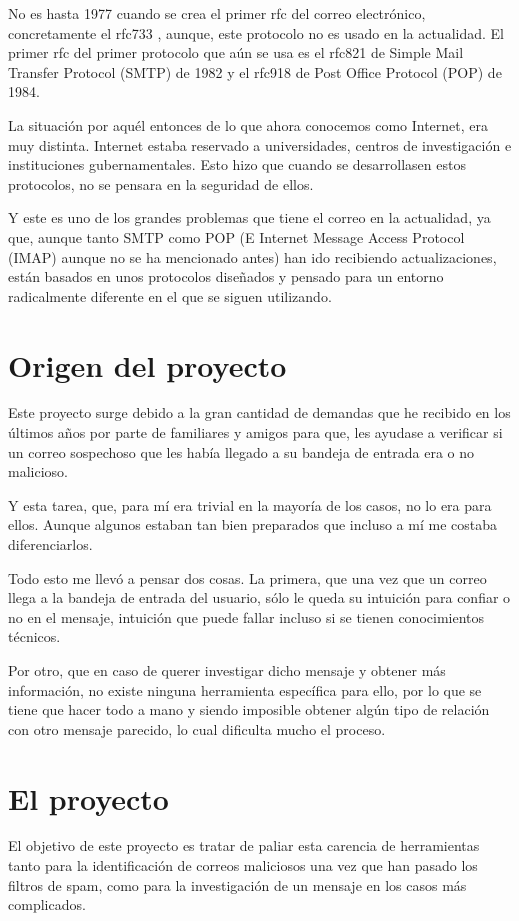No es hasta 1977 cuando se crea el primer rfc del correo electrónico, concretamente el rfc733 \cite{rfc733}, aunque, este protocolo no es usado en la actualidad. El primer rfc del primer protocolo que aún se usa es el rfc821 \cite{rfc821}  de Simple Mail Transfer Protocol (SMTP) de 1982 y el rfc918 \cite{rfc918}  de Post Office Protocol (POP) de 1984.

La situación por aquél entonces de lo que ahora conocemos como Internet, era muy distinta. Internet estaba reservado a universidades, centros de investigación e instituciones gubernamentales. Esto hizo que cuando se desarrollasen estos protocolos, no se pensara en la seguridad de ellos.

Y este es uno de los grandes problemas que tiene el correo en la actualidad, ya que, aunque tanto SMTP como POP (E Internet Message Access Protocol (IMAP) \cite{rfc1064} aunque no se ha mencionado antes) han ido recibiendo actualizaciones, están basados en unos protocolos diseñados y pensado para un entorno radicalmente diferente en el que se siguen utilizando.

\section{Origen del proyecto}
Este proyecto surge debido a la gran cantidad de demandas que he recibido en los últimos años por parte de familiares y amigos para que, les ayudase a verificar si un correo sospechoso que les había llegado a su bandeja de entrada era o no malicioso. 

Y esta tarea, que, para mí era trivial en la mayoría de los casos, no lo era para ellos. Aunque algunos estaban tan bien preparados que incluso a mí me costaba diferenciarlos. 

Todo esto me llevó a pensar dos cosas. La primera, que una vez que un correo llega a la bandeja de entrada del usuario, sólo le queda su intuición para confiar o no en el mensaje, intuición que puede fallar incluso si se tienen conocimientos técnicos.

Por otro, que en caso de querer investigar dicho mensaje y obtener más información, no existe ninguna herramienta específica para ello, por lo que se tiene que hacer todo a mano y siendo imposible obtener algún tipo de relación con otro mensaje parecido, lo cual dificulta mucho el proceso. 

\section{El proyecto}
El objetivo de este proyecto es tratar de paliar esta carencia de herramientas tanto para la identificación de correos maliciosos una vez que han pasado los filtros de spam, como para la investigación de un mensaje en los casos más complicados. 

